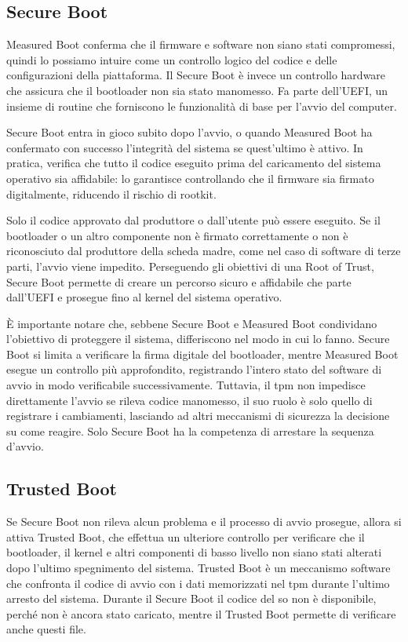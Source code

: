 \subsection{Secure Boot}\label{subsec:secure_boot}

Measured Boot conferma che il firmware e software non siano stati compromessi, quindi lo possiamo intuire come un controllo logico del codice e delle configurazioni della piattaforma. Il Secure Boot è invece un controllo hardware che assicura che il bootloader non sia stato manomesso. Fa parte dell'UEFI, un insieme di routine che forniscono le funzionalità di base per l'avvio del computer.

Secure Boot entra in gioco subito dopo l’avvio, o quando Measured Boot ha confermato con successo l'integrità del sistema se quest’ultimo è attivo. In pratica, verifica che tutto il codice eseguito prima del caricamento del sistema operativo sia affidabile: lo garantisce controllando che il firmware sia firmato digitalmente, riducendo il rischio di rootkit.

Solo il codice approvato dal produttore o dall'utente può essere eseguito. Se il bootloader o un altro componente non è firmato correttamente o non è riconosciuto dal produttore della scheda madre, come nel caso di software di terze parti, l'avvio viene impedito. Perseguendo gli obiettivi di una Root of Trust, Secure Boot permette di creare un percorso sicuro e affidabile che parte dall'UEFI e prosegue fino al kernel del sistema operativo.

È importante notare che, sebbene Secure Boot e Measured Boot condividano l'obiettivo di proteggere il sistema, differiscono nel modo in cui lo fanno. Secure Boot si limita a verificare la firma digitale del bootloader, mentre Measured Boot esegue un controllo più approfondito, registrando l'intero stato del software di avvio in modo verificabile successivamente. Tuttavia, il \acrshort{tpm} non impedisce direttamente l'avvio se rileva codice manomesso, il suo ruolo è solo quello di registrare i cambiamenti, lasciando ad altri meccanismi di sicurezza la decisione su come reagire. Solo Secure Boot ha la competenza di arrestare la sequenza d’avvio.

\subsection{Trusted Boot}\label{subsec:trusted_boot}

Se Secure Boot non rileva alcun problema e il processo di avvio prosegue, allora si attiva Trusted Boot, che effettua un ulteriore controllo per verificare che il bootloader, il kernel e altri componenti di basso livello non siano stati alterati dopo l’ultimo spegnimento del sistema. Trusted Boot è un meccanismo software che confronta il codice di avvio con i dati memorizzati nel \acrshort{tpm} durante l'ultimo arresto del sistema. Durante il Secure Boot il codice del \acrshort{so} non è disponibile, perché non è ancora stato caricato, mentre il Trusted Boot permette di verificare anche questi file.


